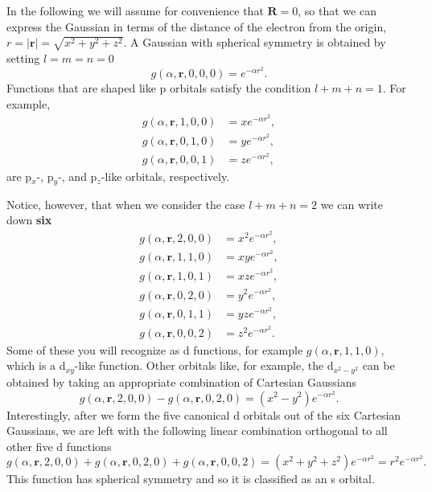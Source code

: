 \documentclass[../Main/chem532-notes.tex]{subfiles}
\begin{document}
In the following we will assume for convenience that $\mathbf{R} = 0$, so that we can express the Gaussian in terms of the distance of the electron from the origin, $r = |\mathbf{r}| = \sqrt{x^2 + y^2 + z^2}$.
A Gaussian with spherical symmetry is obtained by setting $l=m=n=0$
\begin{equation}
g(\alpha, \mathbf{r},0,0,0) = e^{-\alpha r^2}.
\end{equation}
Functions that are shaped like p orbitals satisfy the condition $l + m + n = 1$. For example,
\begin{align}
g(\alpha, \mathbf{r},1,0,0) & = x e^{-\alpha r^2},\\
g(\alpha, \mathbf{r},0,1,0) & = y e^{-\alpha r^2},\\
g(\alpha, \mathbf{r},0,0,1) & = z e^{-\alpha r^2},
\end{align}
are p$_x$-, p$_y$-, and p$_z$-like orbitals, respectively.

Notice, however, that when we consider the case $l + m + n = 2$ we can write down \textbf{six} \begin{align}
g(\alpha, \mathbf{r},2,0,0) & = x^2 e^{-\alpha r^2},\\
g(\alpha, \mathbf{r},1,1,0) & = xy e^{-\alpha r^2},\\
g(\alpha, \mathbf{r},1,0,1) & = xz e^{-\alpha r^2},\\
g(\alpha, \mathbf{r},0,2,0) & = y^2 e^{-\alpha r^2},\\
g(\alpha, \mathbf{r},0,1,1) & = yz e^{-\alpha r^2},\\
g(\alpha, \mathbf{r},0,0,2) & = z^2 e^{-\alpha r^2}.
\end{align}
Some of these you will recognize as d functions, for example $g(\alpha, \mathbf{r},1,1,0)$, which is a d$_{xy}$-like function.
Other orbitals like, for example, the d$_{x^2 - y^2}$ can be obtained by taking an appropriate combination of Cartesian Gaussians
\begin{equation}
g(\alpha, \mathbf{r},2,0,0)- g(\alpha, \mathbf{r},0,2,0) = (x^2 - y^2) e^{-\alpha r^2}.
\end{equation}
Interestingly, after we form the five canonical d orbitals out of the six Cartesian Gaussians, we are left with the following linear combination orthogonal to all other five d functions
\begin{equation}
g(\alpha, \mathbf{r},2,0,0)+g(\alpha, \mathbf{r},0,2,0)+g(\alpha, \mathbf{r},0,0,2) = (x^2 + y^2 + z^2) e^{-\alpha r^2} = r^2 e^{-\alpha r^2}.
\end{equation}
This function has spherical symmetry and so it is classified as an s orbital.
\end{document}
